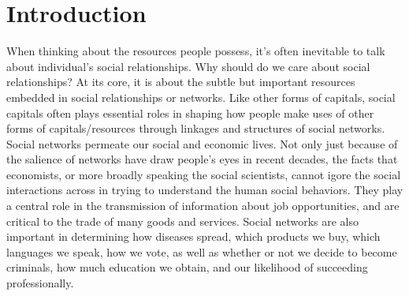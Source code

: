 \documentclass{article}
\begin{document}


\tableofcontents

\setcounter{pnumb}{\value{page}}       	%
\setcounter{page}{\value{pnumb}}       	%
\newpage
\section{Introduction}






When thinking about the resources people possess, it's often inevitable to talk about individual's social relationships.  Why should do we care about social relationships? At its core, it is about the subtle but important resources embedded in social relationships or networks. Like other forms of capitals, social capitals often plays essential roles in shaping how people make uses of other forms of capitals/resources through linkages and structures of social networks. Social networks permeate our social and economic lives. Not only just because of the salience of networks have draw people's eyes in recent decades, the facts that economists, or more broadly speaking the social scientists, cannot igore the social interactions across in trying to understand the human social behaviors. They play a central role in the transmission of information about job opportunities, and are critical to the trade of many goods and services. Social networks are also important in determining how diseases spread, which products we buy, which languages we speak, how we vote, as well as whether or not we decide to become criminals, how much education we obtain, and our likelihood of succeeding professionally.
\end{document}
